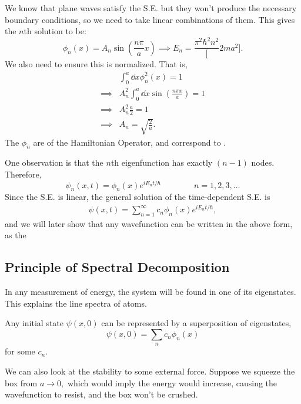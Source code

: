 \documentclass{article}
\numberwithin{equation}{section}
\begin{document}
We know that plane waves satisfy the S.E. but they won't produce the necessary boundary conditions, so we need to take linear combinations of them. This gives the $n$th solution to be:
\begin{equation*}
    \phi_n(x) = A_n\sin\left(\frac{n\pi}{a}x\right) \implies E_n = \frac{\pi^2 \hbar^2 n^2}[2ma^2].
\end{equation*}
We also need to ensure this is normalized. That is,
\begin{align*}
    & \int_0^a \dd{x} \phi_n^2(x) = 1 \\ 
\implies & A_n^2 \int_0^a \dd{x} \sin\left(\frac{n\pi x}{a} \right) = 1\\ 
\implies & A_n^2\frac{a}{2} = 1 \\ 
\implies & A_n = \sqrt{\frac{2}{a}}.
\end{align*}
The $\phi_n$ are  of the Hamiltonian Operator, and correspond to .

One observation is that the $n$th eigenfunction has exactly $(n-1)$ nodes. Therefore,
\begin{equation*}
    \psi_n(x,t) = \phi_n(x)e^{iE_nt/\hbar}\quad\quad\quad\quad n=1,2,3,\dots
\end{equation*}
Since the S.E. is linear, the general solution of the time-dependent S.E. is
\begin{align*}
    \psi(x,t) = \sum_{n=1}^\infty c_n\phi_n(x)e^{iE_nt/\hbar},
\end{align*}
and we will later show that any wavefunction can be written in the above form, as the 
\subsection{Principle of Spectral Decomposition}
In any measurement of energy, the system will be found in one of its eigenstates. This explains the line spectra of atoms.

Any initial state $\psi(x,0)$ can be represented by a superposition of eigenstates,
\begin{equation*}
    \psi(x,0) = \sum_n c_n \phi_n(x)
\end{equation*}
for some $c_n.$

We can also look at the stability to some external force. Suppose we squeeze the box from $a\to 0,$ which would imply the energy would increase, causing the wavefunction to resist, and the box won't be crushed.
\end{document}
